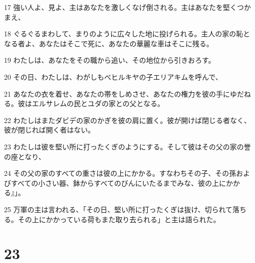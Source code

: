 \par 17 強い人よ、見よ、主はあなたを激しくなげ倒される。主はあなたを堅くつかまえ、
\par 18 ぐるぐるまわして、まりのように広々した地に投げられる。主人の家の恥となる者よ、あなたはそこで死に、あなたの華麗な車はそこに残る。
\par 19 わたしは、あなたをその職から追い、その地位から引きおろす。
\par 20 その日、わたしは、わがしもべヒルキヤの子エリアキムを呼んで、
\par 21 あなたの衣を着せ、あなたの帯をしめさせ、あなたの権力を彼の手にゆだねる。彼はエルサレムの民とユダの家との父となる。
\par 22 わたしはまたダビデの家のかぎを彼の肩に置く。彼が開けば閉じる者なく、彼が閉じれば開く者はない。
\par 23 わたしは彼を堅い所に打ったくぎのようにする。そして彼はその父の家の誉の座となり、
\par 24 その父の家のすべての重さは彼の上にかかる。すなわちその子、その孫およびすべての小さい器、鉢からすべてのびんにいたるまでみな、彼の上にかかる』」。
\par 25 万軍の主は言われる、「その日、堅い所に打ったくぎは抜け、切られて落ちる。その上にかかっている荷もまた取り去られる」と主は語られた。

\chapter{23}

